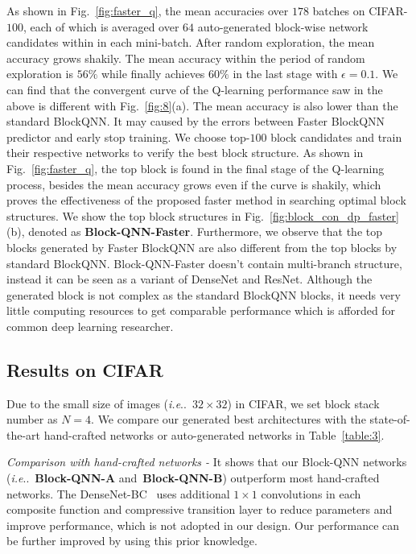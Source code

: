 \documentclass[10pt,journal,compsoc]{IEEEtran}
\makeatletter
\DeclareRobustCommand\onedot{\futurelet\@let@token\@onedot}
\def\@onedot{\ifx\@let@token.\else.\null\fi\xspace}
\def\ie{\emph{i.e}\onedot} \def\Ie{\emph{I.e}\onedot}
\makeatother
\begin{document}
As shown in Fig.~\ref{fig:faster_q}, the mean accuracies over $178$ batches on CIFAR-$100$, each of which is averaged over $64$ auto-generated block-wise network candidates within in each mini-batch. After random exploration, the mean accuracy grows shakily. The mean accuracy within the period of random exploration is $56\%$ while finally achieves $60\%$ in the last stage with $\epsilon=0.1$. We can find that the convergent curve of the Q-learning performance saw in the above is different with Fig.~\ref{fig:8}(a). The mean accuracy is also lower than the standard BlockQNN. It may caused by the errors between Faster BlockQNN predictor and early stop training.
We choose top-$100$ block candidates and train their respective networks to verify the best block structure. As shown in Fig.~\ref{fig:faster_q}, the top block is found in the final stage of the Q-learning process, besides the mean accuracy grows even if the curve is shakily, which proves the effectiveness of the proposed faster method in searching optimal block structures.
We show the top block structures in Fig.~\ref{fig:block_con_dp_faster}(b), denoted as \textbf{Block-QNN-Faster}.
Furthermore, we observe that the top blocks generated by Faster BlockQNN are also different from the top blocks by standard BlockQNN. Block-QNN-Faster doesn't contain multi-branch structure, instead it can be seen as a variant of DenseNet and ResNet. Although the generated block is not complex as the standard BlockQNN blocks, it needs very little computing resources to get comparable performance which is afforded for common deep learning researcher. 



\subsection{Results on CIFAR}
\label{sec:result_cifar}
Due to the small size of images (\ie~$32\times 32$) in CIFAR, we set block stack number as $N=4$. We compare our generated best architectures with the state-of-the-art hand-crafted networks or auto-generated networks in Table~\ref{table:3}.

\vspace{0.1cm} \noindent \textit{Comparison with hand-crafted networks -}
It shows that our Block-QNN networks (\ie~\textbf{Block-QNN-A} and~\textbf{Block-QNN-B}) outperform most hand-crafted networks. The DenseNet-BC~\cite{huang2016densely} uses additional $1\times 1$ convolutions in each composite function and compressive transition layer to reduce parameters and improve performance, which is not adopted in our design. Our performance can be further improved by using this prior knowledge.
\end{document}
